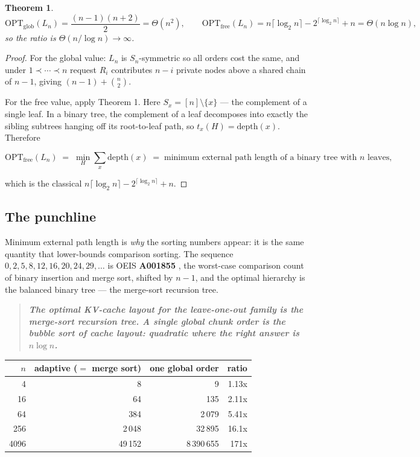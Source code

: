 \documentclass[11pt]{article}
\theoremstyle{plain}
\newtheorem{theorem}{Theorem}
\begin{document}
\begin{theorem}
\[
\mathrm{OPT}_{\mathrm{glob}}(L_n) = \frac{(n-1)(n+2)}{2} = \Theta(n^2), \qquad
\mathrm{OPT}_{\mathrm{free}}(L_n) = n\lceil \log_2 n\rceil - 2^{\lceil \log_2 n\rceil} + n = \Theta(n\log n),
\]
so the ratio is $\Theta(n/\log n) \to \infty$.
\end{theorem}
\begin{proof}
For the global value: $L_n$ is $S_n$-symmetric so all orders cost the same, and under $1\prec\cdots\prec n$ request $R_i$ contributes $n-i$ private nodes above a shared chain of $n-1$, giving $(n-1)+\binom{n}{2}$.

For the free value, apply Theorem 1. Here $S_x = [n]\setminus\{x\}$ --- the complement of a single leaf. In a binary tree, the complement of a leaf decomposes into exactly the sibling subtrees hanging off its root-to-leaf path, so $t_x(H) = \mathrm{depth}(x)$. Therefore

\[
\mathrm{OPT}_{\mathrm{free}}(L_n) \;=\; \min_H \sum_{x} \mathrm{depth}(x) \;=\; \text{minimum external path length of a binary tree with } n \text{ leaves},
\]

which is the classical $n\lceil\log_2 n\rceil - 2^{\lceil\log_2 n\rceil}+n$. 
\end{proof}

\subsection{The punchline}

Minimum external path length is \emph{why} the sorting numbers appear: it is the same quantity that lower-bounds comparison sorting. The sequence $0,2,5,8,12,16,20,24,29,\dots$ is OEIS \textbf{A001855} \cite{OEIS}, the worst-case comparison count of binary insertion and merge sort, shifted by $n-1$, and the optimal hierarchy is the balanced binary tree --- the merge-sort recursion tree.

\begin{quote}\itshape
\textbf{The optimal KV-cache layout for the leave-one-out family is the merge-sort recursion tree. A single global chunk order is the bubble sort of cache layout: quadratic where the right answer is $n\log n$.}
\end{quote}

\begin{center}\small
\begin{tabular}{rrrr}\toprule
$n$ & adaptive ($=$ merge sort) & one global order & ratio \\ \midrule
4 & 8 & 9 & 1.13x \\
16 & 64 & 135 & 2.11x \\
64 & 384 & 2\,079 & 5.41x \\
256 & 2\,048 & 32\,895 & 16.1x \\
4096 & 49\,152 & 8\,390\,655 & 171x \\
\bottomrule\end{tabular}\end{center}
\end{document}
